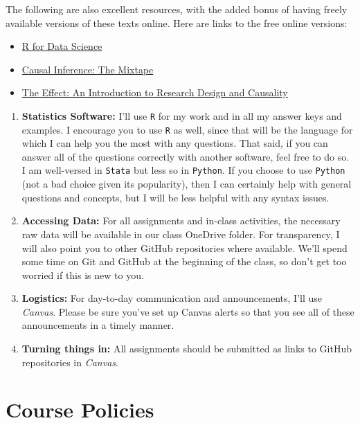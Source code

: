 \documentclass[11pt,]{article}
\providecommand{\tightlist}{%
  \setlength{\itemsep}{0pt}\setlength{\parskip}{0pt}}
\begin{document}
The following are also excellent resources, with the added bonus of
having freely available versions of these texts online. Here are links
to the free online versions:

\begin{itemize}
\tightlist
\item
  \href{https://r4ds.had.co.nz/}{R for Data Science}
\item
  \href{https://mixtape.scunning.com/}{Causal Inference: The Mixtape}
\item
  \href{https://theeffectbook.net/}{The Effect: An Introduction to
  Research Design and Causality}
\end{itemize}

\begin{enumerate}
\def\labelenumi{\arabic{enumi}.}
\setcounter{enumi}{2}
\item
  \textbf{Statistics Software:} I'll use \texttt{R} for my work and in
  all my answer keys and examples. I encourage you to use \texttt{R} as
  well, since that will be the language for which I can help you the
  most with any questions. That said, if you can answer all of the
  questions correctly with another software, feel free to do so. I am
  well-versed in \texttt{Stata} but less so in \texttt{Python}. If you
  choose to use \texttt{Python} (not a bad choice given its popularity),
  then I can certainly help with general questions and concepts, but I
  will be less helpful with any syntax issues.
\item
  \textbf{Accessing Data:} For all assignments and in-class activities,
  the necessary raw data will be available in our class OneDrive folder.
  For transparency, I will also point you to other GitHub repositories
  where available. We'll spend some time on Git and GitHub at the
  beginning of the class, so don't get too worried if this is new to
  you.
\item
  \textbf{Logistics:} For day-to-day communication and announcements,
  I'll use \emph{Canvas}. Please be sure you've set up Canvas alerts so
  that you see all of these announcements in a timely manner.
\item
  \textbf{Turning things in:} All assignments should be submitted as
  links to GitHub repositories in \emph{Canvas}.
\end{enumerate}

\hypertarget{course-policies}{%
\section{Course Policies}\label{course-policies}}
\end{document}
